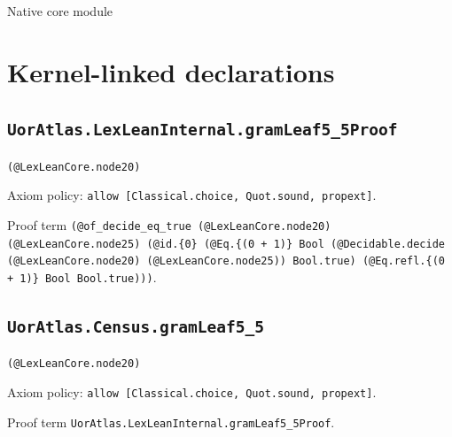 \documentclass[11pt]{article}
\begin{document}
\begin{center}{\LARGE Native core module}\end{center}
\section*{Kernel-linked declarations}
\subsection*{\texttt{UorAtlas.LexLeanInternal.gramLeaf5\_5Proof}}
\noindent\texttt{(@LexLeanCore.node20)}\par
\noindent Axiom policy: \texttt{allow [Classical.choice, Quot.sound, propext]}.\par
\noindent Proof term \texttt{(@of\_decide\_eq\_true (@LexLeanCore.node20) (@LexLeanCore.node25) (@id.\{0\} (@Eq.\{(0 + 1)\} Bool (@Decidable.decide (@LexLeanCore.node20) (@LexLeanCore.node25)) Bool.true) (@Eq.refl.\{(0 + 1)\} Bool Bool.true)))}.\par
\subsection*{\texttt{UorAtlas.Census.gramLeaf5\_5}}
\noindent\texttt{(@LexLeanCore.node20)}\par
\noindent Axiom policy: \texttt{allow [Classical.choice, Quot.sound, propext]}.\par
\noindent Proof term \texttt{UorAtlas.LexLeanInternal.gramLeaf5\_5Proof}.\par
\end{document}
